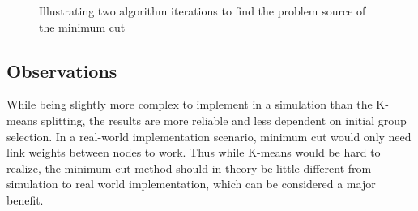 \begin{figure}[h]
	\centering
		\qquad
		\caption{Illustrating two algorithm iterations to find the problem source of the minimum cut}%
		\label{fig:mincutbug}%
\end{figure}


\subsection{Observations}
While being slightly more complex to implement in a simulation than the K-means splitting, the results are more reliable and less dependent 
on initial group selection. In a real-world implementation scenario, minimum cut would only need link weights between nodes to work.
Thus while K-means would be hard to realize, the minimum cut method should in theory be little different from simulation to real world implementation, which can be considered
a major benefit. 

